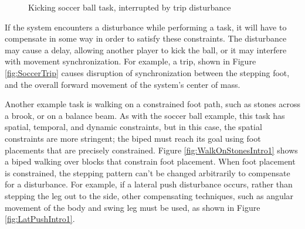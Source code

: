\documentclass{llncs}
\begin{document}
\begin{figure}[b]
 \vspace{-10pt}
\caption{Kicking soccer ball task, interrupted by trip disturbance}
\label{fig:Soccer1}
\end{figure}

If the system encounters a disturbance while performing a task, it will have to compensate in some way in order to satisfy these constraints.  
The disturbance may cause a delay, allowing another player to kick the ball, or it may interfere with movement synchronization.  
For example, a trip, shown in Figure \ref{fig:SoccerTrip} causes disruption of synchronization between the stepping foot, and the overall forward movement 
of the system’s center of mass. 

Another example task is walking on a constrained foot path, such as stones across a brook, or on a balance beam.  
As with the soccer ball example, this task has spatial, temporal, and dynamic constraints, but in this case, the spatial constraints are more stringent;  
the biped must reach its goal using foot placements that are precisely constrained. 
Figure \ref{fig:WalkOnStonesIntro1} shows a biped walking over blocks that constrain foot placement.  
When foot placement is constrained, the stepping pattern can’t be changed arbitrarily to compensate for a disturbance.  
For example, if a lateral push disturbance occurs, rather than stepping the leg out to the side, other compensating techniques, 
such as angular movement of the body and swing leg must be used, as shown in Figure \ref{fig:LatPushIntro1}.
\end{document}
